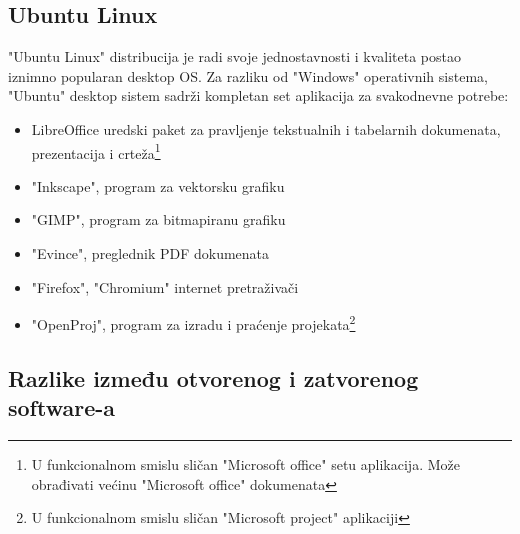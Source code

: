 \documentclass[times, utf8, seminar]{fit}
\begin{document}
\subsection{Ubuntu Linux}
"Ubuntu Linux" distribucija je radi svoje jednostavnosti i kvaliteta postao iznimno popularan desktop OS. Za razliku od "Windows" operativnih sistema, "Ubuntu" desktop sistem sadrži kompletan set aplikacija za svakodnevne potrebe:
\begin{itemize}
  \item LibreOffice uredski paket za pravljenje tekstualnih i tabelarnih dokumenata, prezentacija i crteža\footnote{U funkcionalnom smislu sličan "Microsoft office" setu aplikacija. Može obrađivati većinu "Microsoft office" dokumenata}
  \item "Inkscape", program za vektorsku grafiku \cite{inkscape}
  \item "GIMP", program za bitmapiranu grafiku
  \item "Evince", preglednik PDF dokumenata
  \item "Firefox", "Chromium" internet pretraživači
  \item "OpenProj", program za izradu i praćenje projekata\footnote{U funkcionalnom smislu sličan "Microsoft project" aplikaciji}
\end{itemize}  

\subsection{Razlike između otvorenog i zatvorenog software-a} 
\end{document}
